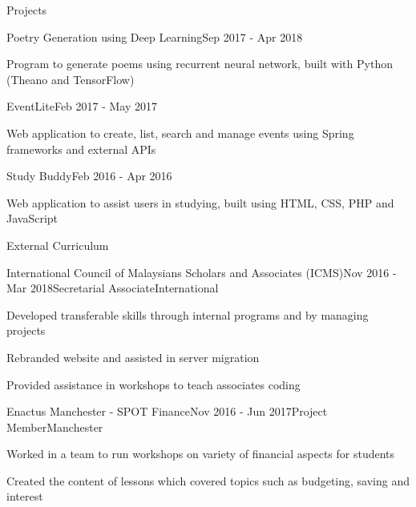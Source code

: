 \documentclass{techresume} %
\begin{document}

\begin{rSection}{Projects}

\begin{rSubsection}{Poetry Generation using Deep Learning}{Sep 2017 - Apr 2018}{}{}
\item[] Program to generate poems using recurrent neural network, built with Python (Theano and TensorFlow)
\end{rSubsection}

\begin{rSubsection}{EventLite}{Feb 2017 - May 2017}{}{}
\item[] Web application to create, list, search and manage events using Spring frameworks and external APIs
\end{rSubsection}

\begin{rSubsection}{Study Buddy}{Feb 2016 - Apr 2016}{}{}
\item[] Web application to assist users in studying, built using HTML, CSS, PHP and JavaScript
\end{rSubsection}

\end{rSection}


\begin{rSection}{External Curriculum}

\begin{rSubsection}{International Council of Malaysians Scholars and Associates (ICMS)}{Nov 2016 - Mar 2018}{Secretarial Associate}{International}
\item Developed transferable skills through internal programs and by managing projects
\item Rebranded website and assisted in server migration
\item Provided assistance in workshops to teach associates coding
\end{rSubsection}

\begin{rSubsection}{Enactus Manchester - SPOT Finance}{Nov 2016 - Jun 2017}{Project Member}{Manchester}
\item Worked in a team to run workshops on variety of financial aspects for students
\item Created the content of lessons which covered topics such as budgeting, saving and interest
\end{rSubsection}

\end{rSection}
\end{document}
